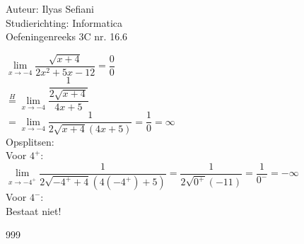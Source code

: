 \documentclass[a4paper]{article}
\newcommand{\llim}{\lim\limits}
\begin{document}
\noindent \large Auteur: Ilyas Sefiani \\
\noindent \large Studierichting: Informatica\\
\noindent \large Oefeningenreeks 3C nr. 16.6\\

\medskip

\normalsize

$\llim_{x \rightarrow -4} \dfrac{\sqrt{x+4}}{2x^2+5x-12} = \dfrac{0}{0}$\\

$\overset{H}{=}\llim_{x \rightarrow -4} \dfrac{\dfrac{1}{2\sqrt{x+4}}}{4x+5}$\\

$= \llim_{x \rightarrow -4} \dfrac{1}{2\sqrt{x+4}(4x+5)} = \dfrac{1}{0} = \infty$\\  

Opsplitsen:\\

Voor $4^+$:\\

$\llim_{x \rightarrow -4^+} \dfrac{1}{2\sqrt{-4^++4}(4(-4^+)+5)} = \dfrac{1}{2\sqrt{0^+}(-11)} = \dfrac{1}{0^-} = -\infty$\\

Voor $4^-$:\\

Bestaat niet!\\

\begin{thebibliography}{999}
\end{thebibliography}
\end{document}
